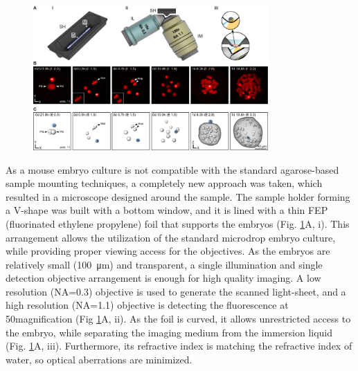     \begin{figure}[tb]
      \centering
      \includegraphics[width=0.8\textwidth]{mammals/Figure2}
      \label{fig:preMouse}
    \end{figure}

    As a mouse embryo culture is not compatible with the standard agarose-based sample mounting techniques, a completely new approach was taken, which resulted in a microscope designed around the sample. The sample holder forming a V-shape was built with a bottom window, and it is lined with a thin FEP (fluorinated ethylene propylene) foil that supports the embryos (Fig. \ref{fig:preMouse}A, i). This arrangement allows the utilization of the standard microdrop embryo culture, while providing proper viewing access for the objectives. As the embryos are relatively small (\SI{100}{\micro m}) and transparent, a single illumination and single detection objective arrangement is enough for high quality imaging. A low resolution (NA=0.3) objective is used to generate the scanned light-sheet, and a high resolution (NA=1.1) objective is detecting the fluorescence at 50\texttimes magnification (Fig \ref{fig:preMouse}A, ii). As the foil is curved, it allows unrestricted access to the embryo, while separating the imaging medium from the immersion liquid (Fig. \ref{fig:preMouse}A, iii). Furthermore, its refractive index is matching the refractive index of water, so optical aberrations are minimized.


